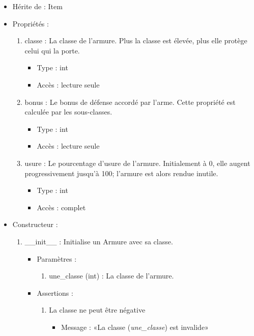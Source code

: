 \documentclass[12pt,pdftex,oneside]{article}
\begin{document}
  \begin{itemize}
  \item Hérite de : Item
  \item Propriétés : 
    \begin{enumerate}
    \item classe : La classe de l'armure. Plus la classe est élevée, plus elle
      protège celui qui la porte.
          \begin{itemize}
          \item Type : int
          \item Accès : lecture seule
          \end{itemize}
    \item bonus : Le bonus de défense accordé par l'arme. Cette propriété est
      calculée par les sous-classes.
          \begin{itemize}
          \item Type : int
          \item Accès : lecture seule
          \end{itemize}
    \item usure : Le pourcentage d'usure de l'armure. Initialement à 0, elle
      augent progressivement jusqu'à 100; l'armure est alors rendue inutile.
          \begin{itemize}
          \item Type : int
          \item Accès : complet
          \end{itemize}

    \end{enumerate}

  \item Constructeur : 

  \begin{enumerate}
  \item \_\_init\_\_ : Initialise un Armure avec sa classe.
    \begin{itemize}
    \item Paramètres : 
      \begin{enumerate}
      \item une\_classe (int) : La classe de l'armure.
      \end{enumerate}
      \item Assertions : 
        \begin{enumerate}
        \item La classe ne peut être négative
          \begin{itemize}
          \item Message : «La classe (\emph{une\_classe}) est invalide»
          \end{itemize}
        \end{enumerate}
    \end{itemize}


\end{enumerate}
\end{itemize}
\end{document}
